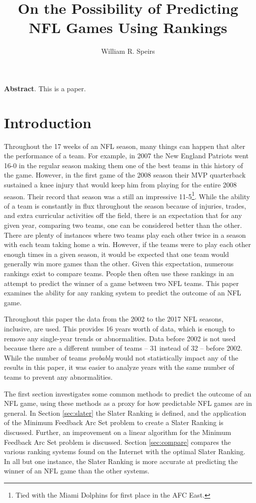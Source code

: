 \documentclass[11pt]{article}
\title{On the Possibility of Predicting NFL Games Using Rankings}
\author{William R. Speirs}
\date{} %
\begin{document}
\maketitle

\small
\textbf{Abstract}. This is a paper.\\
\normalsize


\section{Introduction}

Throughout the 17 weeks of an NFL season, many things can happen that alter the performance of a team. For example, in 2007 the New England Patriots went 16-0\cite{ESPN:ne_2007} in the regular season making them one of the best teams in this history of the game. However, in the first game of the 2008 season their MVP quarterback sustained a knee injury that would keep him from playing for the entire 2008 season.\cite{wiki:tom_brady} Their record that season was a still an impressive 11-5\footnote{Tied with the Miami Dolphins for first place in the AFC East.}.\cite{ESPN:ne_2008} While the ability of a team is constantly in flux throughout the season because of injuries, trades, and extra curricular activities off the field, there is an expectation that for any given year, comparing two teams, one can be considered better than the other. There are plenty of instances where two teams play each other twice in a season with each team taking home a win. However, if the teams were to play each other enough times in a given season, it would be expected that one team would generally win more games than the other. Given this expectation, numerous rankings exist to compare teams. People then often use these rankings in an attempt to predict the winner of a game between two NFL teams. This paper examines the ability for any ranking system to predict the outcome of an NFL game.

Throughout this paper the data from the 2002 to the 2017 NFL seasons, inclusive, are used. This provides 16 years worth of data, which is enough to remove any single-year trends or abnormalities. Data before 2002 is not used because there are a different number of teams -- 31 instead of 32 -- before 2002. While the number of teams \emph{probably} would not statistically impact any of the results in this paper, it was easier to analyze years with the same number of teams to prevent any abnormalities.

The first section investigates some common methods to predict the outcome of an NFL game, using these methods as a proxy for how predictable NFL games are in general. In Section \ref{sec:slater} the Slater Ranking is defined, and the application of the Minimum Feedback Arc Set problem to create a Slater Ranking is discussed. Further, an improvement on a linear algorithm for the Minimum Feedback Arc Set problem is discussed. Section \ref{sec:compare} compares the various ranking systems found on the Internet with the optimal Slater Ranking. In all but one instance, the Slater Ranking is more accurate at predicting the winner of an NFL game than the other systems.
\end{document}
